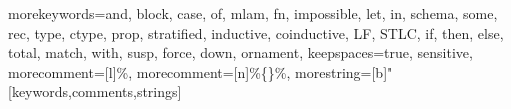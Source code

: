 \usepackage[T1]{fontenc}

\usepackage{xspace}
\usepackage{xcolor}
\usepackage{tcolorbox}

\usepackage{graphicx}

\usepackage{cleveref}

\usepackage{multirow}



\usepackage{proof}

\usepackage{listings}
{
  morekeywords={and, block, case, of, mlam, fn, impossible, let, in, schema,
    some, rec, type, ctype, prop, stratified, inductive, coinductive,
    LF, STLC,
    if, then, else,
    total, match, with,
    susp, force, down,
    ornament},
  keepspaces=true,
  sensitive,
  morecomment=[l]{\%},
  morecomment=[n]{\%\{}{\}\%},
  morestring=[b]"
}[keywords,comments,strings]

\lstset{language=ContextualML}


